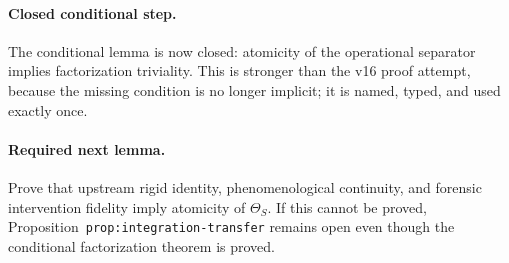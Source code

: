 \paragraph{Closed conditional step.}
The conditional lemma is now closed: atomicity of the operational separator
implies factorization triviality. This is stronger than the v16 proof attempt,
because the missing condition is no longer implicit; it is named, typed, and
used exactly once.

\paragraph{Required next lemma.}
Prove that upstream rigid identity, phenomenological continuity, and forensic
intervention fidelity imply atomicity of \(\Theta_S\). If this cannot be
proved, Proposition~\texttt{prop:integration-transfer} remains open even though
the conditional factorization theorem is proved.
